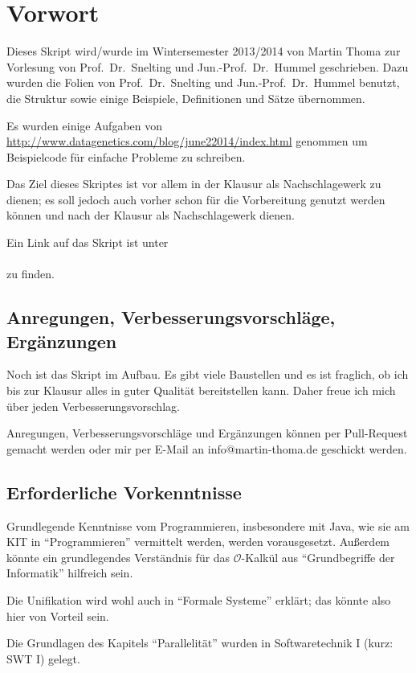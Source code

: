 \chapter*{Vorwort}
Dieses Skript wird/wurde im Wintersemester 2013/2014
von Martin Thoma zur Vorlesung von Prof.~Dr.~Snelting und Jun.-Prof.~Dr.~Hummel 
geschrieben. Dazu wurden
die Folien von Prof.~Dr.~Snelting und Jun.-Prof.~Dr.~Hummel benutzt, die Struktur
sowie einige Beispiele, Definitionen und Sätze übernommen.

Es wurden einige Aufgaben von \url{http://www.datagenetics.com/blog/june22014/index.html}
genommen um Beispielcode für einfache Probleme zu schreiben.

Das Ziel dieses Skriptes ist vor allem
in der Klausur als Nachschlagewerk zu dienen; es soll jedoch auch
vorher schon für die Vorbereitung genutzt werden können und nach
der Klausur als Nachschlagewerk dienen.

Ein Link auf das Skript ist unter \\
\href{http://martin-thoma.com/programmierparadigmen/}{}\\
zu finden.

\section*{Anregungen, Verbesserungsvorschläge, Ergänzungen}
Noch ist das Skript im Aufbau. Es gibt viele Baustellen und es ist
fraglich, ob ich bis zur Klausur alles in guter Qualität bereitstellen
kann. Daher freue ich mich über jeden Verbesserungsvorschlag.

Anregungen, Verbesserungsvorschläge und Ergänzungen können per
Pull-Request gemacht werden oder mir per E-Mail an info@martin-thoma.de
geschickt werden.

\section*{Erforderliche Vorkenntnisse}
Grundlegende Kenntnisse vom Programmieren, insbesondere mit Java,
wie sie am KIT in \enquote{Programmieren} vermittelt werden, werden
vorausgesetzt. Außerdem könnte ein grundlegendes Verständnis für 
das $\mathcal{O}$-Kalkül aus \enquote{Grundbegriffe der Informatik} hilfreich sein.

Die Unifikation wird wohl auch in \enquote{Formale Systeme}
erklärt; das könnte also hier von Vorteil sein.

Die Grundlagen des Kapitels \enquote{Parallelität} wurden in Softwaretechnik I
(kurz: SWT I) gelegt.